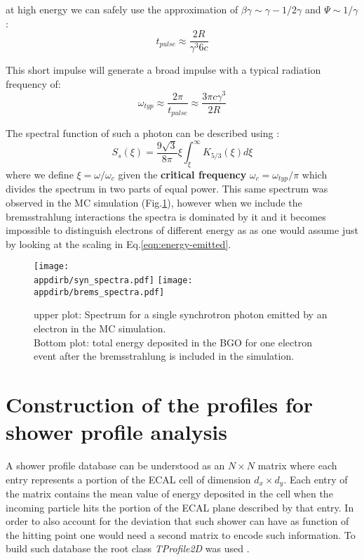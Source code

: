 at high energy we can safely use the approximation of $\beta \gamma \sim \gamma - 1/2\gamma$ and $\Psi \sim 1/\gamma$:
\[t_{pulse} \approx \frac{2 R}{\gamma^3 6c}\]

This short impulse will generate a broad impulse with a typical radiation frequency of:
\[\omega_{typ} \approx \frac{2 \pi}{t_{pulse}} \approx \frac{3 \pi  c \gamma^3}{2 R} \]

The spectral function of such a photon can be described using \cite{synchrotron-radiation}:
\begin{equation}
\label{eqn:sync_spectrum}
S_s(\xi) = \frac{9 \sqrt{3}}{8 \pi}\xi \int_{\xi}^{\infty}K_{5/3}(\xi)d\xi
\end{equation}
where we define $\xi = \omega/\omega_c$ given the \textbf{critical frequency} $\omega_c =\omega_{typ}/\pi$ which divides the spectrum in two parts of equal power. This same spectrum was observed in the MC simulation (Fig.\ref{fig:synch_spectrum}), however when we include the bremsstrahlung interactions the spectra is dominated by it and it becomes impossible to distinguish electrons of different energy as as one would assume just by looking at the scaling in Eq.\ref{eqn:energy-emitted}.


\begin{figure}[h!]
\centering
\texttt{[image: \\appdirb/syn\_spectra.pdf]}
\texttt{[image: \\appdirb/brems\_spectra.pdf]}
\caption{upper plot: Spectrum for a single synchrotron photon emitted by an electron in the MC simulation. \\
Bottom plot: total energy deposited in the BGO for one electron event after the bremsstrahlung is included in the simulation.}
\label{fig:synch_spectrum}
\end{figure}

\FloatBarrier\noindent
\section{Construction of the profiles for shower profile analysis}
\label{Appb:sec:make_profile}

A shower profile database can be understood as an $N\times N$ matrix
where each entry represents a portion of the ECAL cell of dimension
$d_x \times d_y$. Each entry of the matrix contains the mean value of
energy deposited in the cell when the incoming particle hits the
portion of the ECAL plane described by that entry. In order to also
account for the deviation that such shower can have as function of the
hitting point one would need a second matrix to encode such
information. To build such database the root class \textit{TProfile2D} was used \cite{root-tprofile}.

